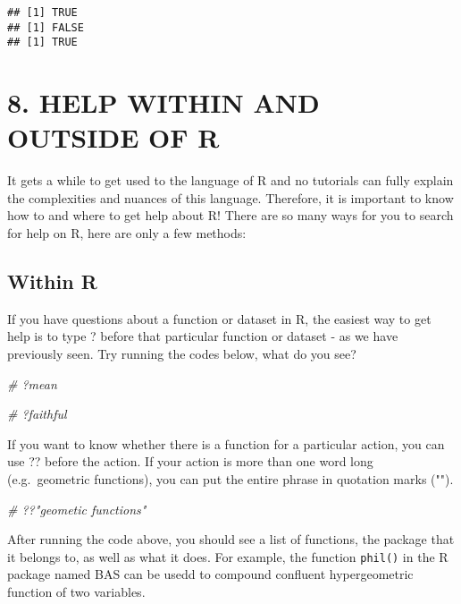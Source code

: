 \documentclass[
]{book}
\newenvironment{Shaded}{\begin{snugshade}}{\end{snugshade}}
\newcommand{\CommentTok}[1]{\textcolor[rgb]{0.56,0.35,0.01}{\textit{#1}}}
\begin{document}
\begin{verbatim}
## [1] TRUE
## [1] FALSE
## [1] TRUE
\end{verbatim}

\hypertarget{help-within-and-outside-of-r}{%
\section{8. HELP WITHIN AND OUTSIDE OF R}\label{help-within-and-outside-of-r}}

It gets a while to get used to the language of R and no tutorials can fully explain the complexities and nuances of this language. Therefore, it is important to know how to and where to get help about R! There are so many ways for you to search for help on R, here are only a few methods:

\hypertarget{within-r}{%
\subsection{Within R}\label{within-r}}

If you have questions about a function or dataset in R, the easiest way to get help is to type ? before that particular function or dataset - as we have previously seen. Try running the codes below, what do you see?

\begin{Shaded}
\begin{Highlighting}[]
\CommentTok{\# ?mean}
\end{Highlighting}
\end{Shaded}

\begin{Shaded}
\begin{Highlighting}[]
\CommentTok{\# ?faithful}
\end{Highlighting}
\end{Shaded}

If you want to know whether there is a function for a particular action, you can use ?? before the action. If your action is more than one word long (e.g.~geometric functions), you can put the entire phrase in quotation marks ("").

\begin{Shaded}
\begin{Highlighting}[]
\CommentTok{\# ??"geometic functions"}
\end{Highlighting}
\end{Shaded}

After running the code above, you should see a list of functions, the package that it belongs to, as well as what it does. For example, the function \texttt{phil()} in the R package named BAS can be usedd to compound confluent hypergeometric function of two variables.
\end{document}
